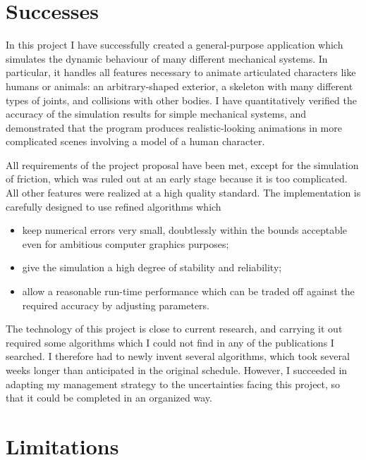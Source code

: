 \section{Successes}

In this project I have successfully created a general-purpose application which simulates
the dynamic behaviour of many different mechanical systems. In particular, it handles all
features necessary to animate articulated characters like humans or animals: an
arbitrary-shaped exterior, a skeleton with many different types of joints, and
collisions with other bodies. I have quantitatively verified the accuracy of the simulation
results for simple mechanical systems, and demonstrated that the program produces
realistic-looking animations in more complicated scenes involving a
model of a human character.

All requirements of the project proposal have been met, except for the simulation of friction,
which was ruled out at an early stage because it is too complicated. All other features were
realized at a high quality standard. The implementation is carefully designed to use refined
algorithms which 
\begin{itemize}
\item keep numerical errors very small, doubtlessly within the bounds acceptable even for
    ambitious computer graphics purposes;
\item give the simulation a high degree of stability and reliability;
\item allow a reasonable run-time performance which can be traded off against the required
    accuracy by adjusting parameters.
\end{itemize}

The technology of this project is close to current research, and carrying it out
required some algorithms which I could not find in any of the publications I searched. I therefore
had to newly invent several algorithms, which took several weeks longer than anticipated in
the original schedule. However, I succeeded in adapting my management strategy
to the uncertainties facing this project, so that it could be completed in an organized way.

\section{Limitations}

